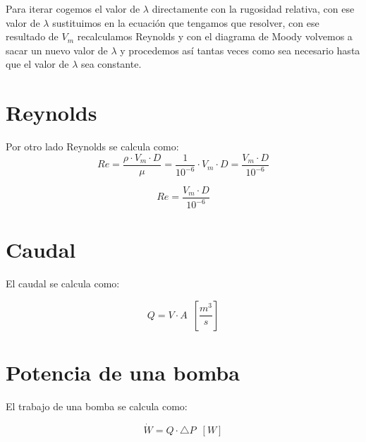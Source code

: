 \documentclass[10pt,a4paper]{article}
\begin{document}
Para iterar cogemos el valor de $\lambda$ directamente con la rugosidad relativa, con ese valor de $\lambda$ sustituimos en la ecuación que tengamos que resolver, con ese resultado de $V_m$ recalculamos Reynolds y con el diagrama de Moody volvemos a sacar un nuevo valor de $\lambda$ y procedemos así tantas veces como sea necesario hasta que el valor de $\lambda$ sea constante.

\section{Reynolds}
Por otro lado Reynolds se calcula como:
$$
Re = \frac{\rho \cdot V_m \cdot D}{\mu} = \frac{1}{10^{-6}} \cdot V_m \cdot D = \frac{V_m \cdot D}{10^{-6}}
$$

\begin{center}
    \begin{tcolorbox}[colback=yellow!40!white, colframe=red!50!black, width=5cm,title=Ecuación de Reynolds]
    $$
        Re =  \frac{V_m \cdot D}{10^{-6}}
    $$
    \end{tcolorbox}
\end{center}

\section{Caudal}
El caudal se calcula como:

\begin{center}
    \begin{tcolorbox}[colback=yellow!40!white, colframe=red!50!black, width=5cm,title=Caudal]
    $$
        Q = V \cdot A \,\,\, \left[ \frac{m^3}{s} \right]
    $$
    \end{tcolorbox}
\end{center}

\section{Potencia de una bomba}
El trabajo de una bomba se calcula como:
\begin{center}
    \begin{tcolorbox}[colback=yellow!40!white, colframe=red!50!black, width=5cm,title=Potencia de una bomba]
    $$
        \dot{W} = Q \cdot \bigtriangleup P \,\,\, [W]
    $$
    \end{tcolorbox}
\end{center}

\newpage
\end{document}
